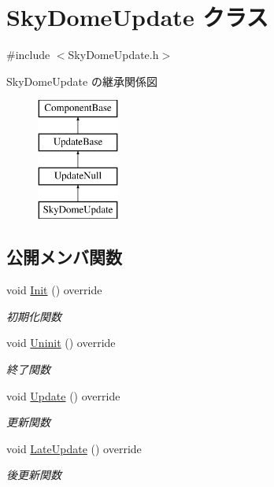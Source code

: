 \hypertarget{class_sky_dome_update}{}\section{Sky\+Dome\+Update クラス}
\label{class_sky_dome_update}


{\ttfamily \#include $<$Sky\+Dome\+Update.\+h$>$}

Sky\+Dome\+Update の継承関係図\begin{figure}[H]
\begin{center}
\leavevmode
\includegraphics[height=4.000000cm]{class_sky_dome_update}
\end{center}
\end{figure}
\subsection*{公開メンバ関数}
\begin{DoxyCompactItemize}
\item 
void \mbox{\hyperlink{class_sky_dome_update_ab4fec6d13590c07e39e6e8b4f7f7613a}{Init}} () override
\begin{DoxyCompactList}\small\item\em 初期化関数 \end{DoxyCompactList}\item 
void \mbox{\hyperlink{class_sky_dome_update_a54da74ef017a22075ce473abe1345489}{Uninit}} () override
\begin{DoxyCompactList}\small\item\em 終了関数 \end{DoxyCompactList}\item 
void \mbox{\hyperlink{class_sky_dome_update_ae163cb90e4de561fe1f7b2cb311be331}{Update}} () override
\begin{DoxyCompactList}\small\item\em 更新関数 \end{DoxyCompactList}\item 
void \mbox{\hyperlink{class_sky_dome_update_a94347cb50b4dc13528738a7b812da261}{Late\+Update}} () override
\begin{DoxyCompactList}\small\item\em 後更新関数 \end{DoxyCompactList}\end{DoxyCompactItemize}
